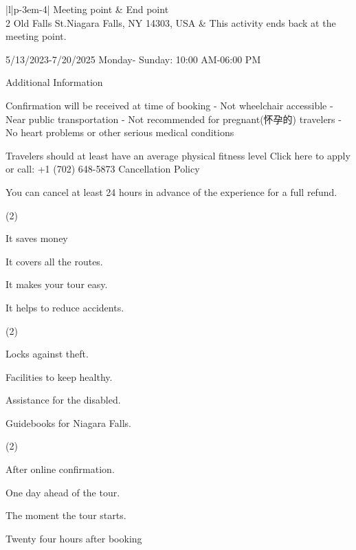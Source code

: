 \documentclass{英语试卷}
\begin{document}
\begin{center}\begin{tabular}{{|l|p{\dimexpr\linewidth-3em-4\tabcolsep}|}}
\hline
Meeting point & End point \\
2 Old Falls St.Niagara Falls, NY 14303, USA & This activity ends back at the meeting point. \\
\hline
\end{tabular}\end{center}
\vspace{0.4em}
\par 5/13/2023-7/20/2025 Monday- Sunday: 10:00 AM-06:00 PM\par
\par Additional Information\par
\par Confirmation will be received at time of booking - Not wheelchair accessible - Near public transportation - Not recommended for pregnant(怀孕的) travelers - No heart problems or other serious medical conditions\par
\par Travelers should at least have an average physical fitness level Click here to apply or call: +1 (702) 648-5873 Cancellation Policy\par
\par You can cancel at least 24 hours in advance of the experience for a full refund.\par
{}
\begin{choices}(2)
  \item It saves money
  \item It covers all the routes.
  \item It makes your tour easy.
  \item It helps to reduce accidents.
\end{choices}
\begin{choices}(2)
  \item Locks against theft.
  \item Facilities to keep healthy.
  \item Assistance for the disabled.
  \item Guidebooks for Niagara Falls.
\end{choices}
\begin{choices}(2)
  \item After online confirmation.
  \item One day ahead of the tour.
  \item The moment the tour starts.
  \item Twenty four hours after booking
\end{choices}
\end{document}
